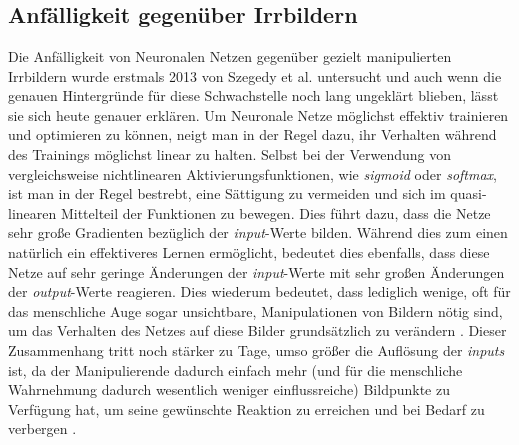 \chapter{}
\label{cha:stateOfTheArt}
\section{Anfälligkeit gegenüber Irrbildern}
Die Anfälligkeit von Neuronalen Netzen gegenüber gezielt manipulierten Irrbildern wurde erstmals 2013 von Szegedy et al. \cite{journals/corr/SzegedyZSBEGF13} untersucht und auch wenn die genauen Hintergründe für diese Schwachstelle noch lang ungeklärt blieben, lässt sie sich heute genauer erklären.
Um Neuronale Netze möglichst effektiv trainieren und optimieren zu können, neigt man in der Regel dazu, ihr Verhalten während des Trainings möglichst linear zu halten. Selbst bei der Verwendung von vergleichsweise nichtlinearen Aktivierungsfunktionen, wie \textit{sigmoid} oder \textit{softmax}, ist man in der Regel bestrebt, eine Sättigung zu vermeiden und sich im quasi-linearen Mittelteil der Funktionen zu bewegen. Dies führt dazu, dass die Netze sehr große Gradienten bezüglich der \textit{input}-Werte bilden. Während dies zum einen natürlich ein effektiveres Lernen ermöglicht, bedeutet dies ebenfalls, dass diese Netze auf sehr geringe Änderungen der \textit{input}-Werte mit sehr großen Änderungen der \textit{output}-Werte reagieren. Dies wiederum bedeutet, dass lediglich wenige, oft für das menschliche Auge sogar unsichtbare, Manipulationen von Bildern nötig sind, um das Verhalten des Netzes auf diese Bilder grundsätzlich zu verändern \cite{goodfellow2014explaining}.
Dieser Zusammenhang tritt noch stärker zu Tage, umso größer die Auflösung der \textit{inputs} ist, da der Manipulierende dadurch einfach mehr (und für die menschliche Wahrnehmung dadurch wesentlich weniger einflussreiche) Bildpunkte zu Verfügung hat, um seine gewünschte Reaktion zu erreichen und bei Bedarf zu verbergen \cite{journals/corr/abs-1802-01421}.

